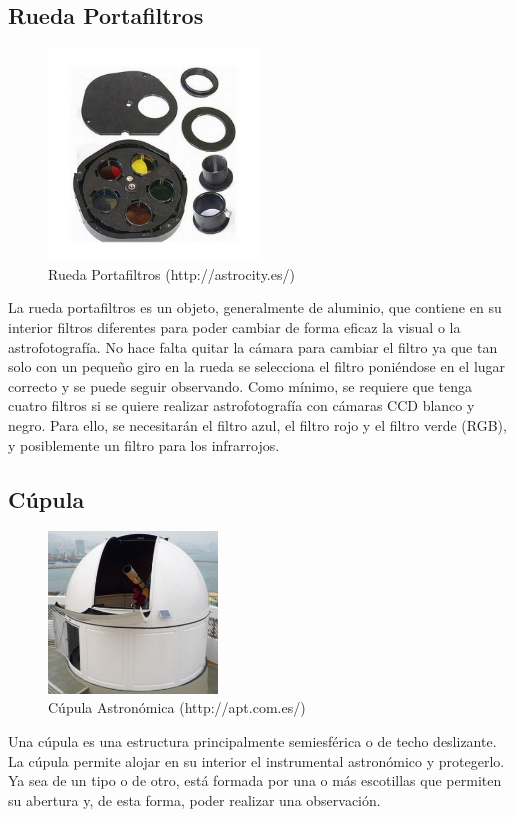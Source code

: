 \subsection{Rueda Portafiltros}
\begin{figure}[htb]
\centering
\includegraphics[width=0.5\textwidth]{./imagenes/ruedaPortafiltros}
\caption{Rueda Portafiltros (http://astrocity.es/)} \label{fig:ruedaPortafiltros}
\end{figure}
La rueda portafiltros es un objeto, generalmente de aluminio, que contiene en su interior filtros diferentes para poder cambiar de forma eficaz la visual o la astrofotografía. No hace falta quitar la cámara para cambiar el filtro ya que tan solo con un pequeño giro en la rueda se selecciona el filtro poniéndose en el lugar correcto y se puede seguir observando.
Como mínimo, se requiere que tenga cuatro filtros si se quiere realizar astrofotografía con cámaras CCD blanco y negro. Para ello, se necesitarán el filtro azul, el filtro rojo y el filtro verde (RGB), y posiblemente un filtro para los infrarrojos.


\subsection{Cúpula}
\begin{figure}[htb]
\centering
\includegraphics[width=0.4\textwidth]{./imagenes/cupula}
\caption{Cúpula Astronómica (http://apt.com.es/)} \label{fig:cupula}
\end{figure}
Una cúpula es una estructura principalmente semiesférica o de techo deslizante. La cúpula permite alojar en su interior el instrumental astronómico y protegerlo. Ya sea de un tipo o de otro, está formada por una o más escotillas que permiten su abertura y, de esta forma, poder realizar una observación.


